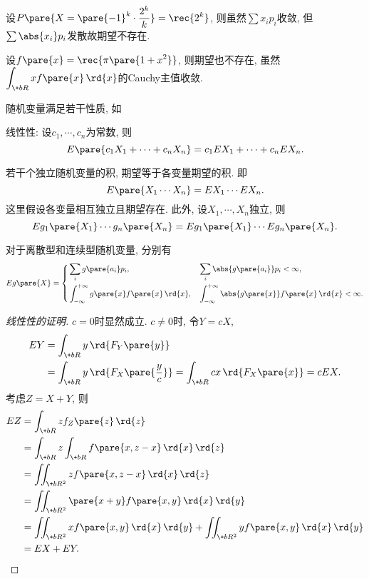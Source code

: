 \documentclass{ctexart}
\begin{document}
\begin{sample}
    \begin{ex}
        设$\displaystyle P\pare{X = \pare{-1}^k\cdot \frac{2^k}{k}} = \rec{2^k}$, 则虽然$\sum x_ip_i$收敛, 但$\sum \abs{x_i} p_i$发散故期望不存在.
    \end{ex}
    \begin{ex}
        设$f\pare{x} = \displaystyle \rec{\pi\pare{1+x^2}}$, 则期望也不存在, 虽然$\displaystyle \int_{\+bR} xf\pare{x}\,\rd{x}$的Cauchy主值收敛.
    \end{ex}
\end{sample}
随机变量满足若干性质, 如
\begin{cenum}
    \item 线性性: 设$c_1,\cdots,c_n$为常数, 则
    \[ E\pare{c_1X_1 + \cdots + c_nX_n} = c_1 EX_1 + \cdots + c_nEX_n. \]
    \item 若干个独立随机变量的积, 期望等于各变量期望的积. 即
    \[ E\pare{X_1\cdots X_n} = EX_1\cdots EX_n. \]
    这里假设各变量相互独立且期望存在. 此外, 设$X_1, \cdots, X_n$独立, 则
    \[ Eg_1\pare{X_1} \cdots g_n\pare{X_n} = Eg_1\pare{X_1}\cdots Eg_n\pare{X_n}. \]
    \item 对于离散型和连续型随机变量, 分别有
    \[ Eg\pare{X} = \left\{ \begin{aligned}
        & \sum_i g\pare{a_i}p_i, && \sum_i \abs{g\pare{a_i}}p_i < \infty, \\
        & \int_{-\infty}^{+\infty} g\pare{x}f\pare{x}\,\rd{x}, && \int_{-\infty}^{+\infty} \abs{g\pare{x}}f\pare{x}\,\rd{x} < \infty.
    \end{aligned}\right. \]
\end{cenum}
\begin{proof}[线性性的证明]
    $c=0$时显然成立. $c\neq 0$时, 令$Y=cX$,
    \begin{align*}
        EY &= \int_{\+bR} y\,\rd{F_Y\pare{y}} \\
        &= \int_{\+bR} y\,\rd{F_X\pare{\frac{y}{c}}} = \int_{\+bR} cx\,\rd{F_X\pare{x}} = cEX.
    \end{align*}
    考虑$Z = X+Y$, 则
    \begin{align*}
        EZ &= \int_{\+bR} zf_Z\pare{z}\,\rd{z} \\
        &= \int_{\+bR} z \int_{\+bR} f\pare{x,z-x}\,\rd{x}\,\rd{z} \\
        &= \iint_{\+bR^2} zf\pare{x,z-x}\,\rd{x}\,\rd{z} \\
        &= \iint_{\+bR^2} \pare{x+y} f\pare{x,y}\,\rd{x}\,\rd{y} \\
        &= \iint_{\+bR^2} xf\pare{x,y}\,\rd{x}\,\rd{y} + \iint_{\+bR^2} yf\pare{x,y}\,\rd{x}\,\rd{y} \\
        &= EX + EY. \qedhere
    \end{align*}
\end{proof}
\end{document}
